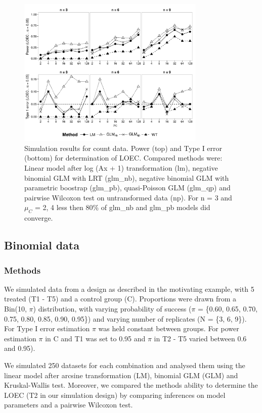 \documentclass{scrartcl}
\begin{document}
\begin{figure}[h]
  \centering
  \includegraphics[width = 0.8\textwidth]{p_loec_c.pdf}
  \caption{Simulation results for count data. Power (top) and Type I error (bottom) for determination of LOEC. Compared methods were: Linear model after log (Ax + 1) transformation (lm), negative binomial GLM with LRT (glm\_nb), negative binomial GLM with parametric boostrap (glm\_pb), quasi-Poisson GLM (glm\_qp) and pairwise Wilcoxon test on untransformed data (np). For n = 3 and $\mu_C$ = {2, 4} less then 80\% of glm\_nb and glm\_pb models did converge.}
  \label{fig:p_loec_c}
\end{figure}



\subsection{Binomial data}
\subsubsection{Methods}
We simulated data from a design as described in the motivating example, with 5 treated (T1 - T5) and a control group (C). 
Proportions were drawn from a Bin(10, $\pi$) distribution, with varying probability of success ($\pi$ = \{0.60, 0.65, 0.70, 0.75, 0.80, 0.85, 0.90, 0.95\}) and varying number of replicates (N = \{3, 6, 9\}).
For Type I error estimation $\pi$ was held constant between groups.
For power estimation $\pi$ in C and T1 was set to 0.95 and $\pi$ in T2 - T5 varied between 0.6 and 0.95). 
 
We simulated 250 datasets for each combination and analysed them using the linear model after arcsine transformation (LM), binomial GLM (GLM) and Kruskal-Wallis test.
Moreover, we compared the methods ability to determine the LOEC (T2 in our simulation design) by comparing inferences on model parameters and a pairwise Wilcoxon test. 
\end{document}
